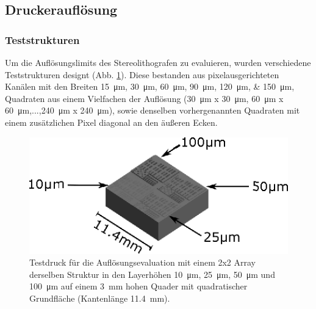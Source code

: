 




\subsection{Druckerauflösung}
\subsubsection{Teststrukturen}
Um die Auflösungslimits des Stereolithografen zu evaluieren, wurden verschiedene Teststrukturen designt (Abb. \ref{fig:ResolutionV1}). Diese bestanden aus pixelausgerichteten Kanälen mit den Breiten \SIlist{15; 30; 60; 90; 120; 150}{\micro \meter}, Quadraten aus einem Vielfachen der Auflösung (\SI{30}{\micro\meter} x \SI{30}{\micro\meter}, \SI{60}{\micro\meter} x \SI{60}{\micro\meter},...,\SI{240}{\micro\meter} x \SI{240}{\micro\meter}), sowie denselben vorhergenannten Quadraten mit einem zusätzlichen Pixel diagonal an den äußeren Ecken.

\begin{figure}[!h]
    \centering
    \includegraphics[width=\linewidth]{img/ResolutionV1.eps}
    \caption{Testdruck für die Auflösungsevaluation mit einem 2x2 Array derselben Struktur in den Layerhöhen \SI{10}{\micro\meter}, \SI{25}{\micro\meter}, \SI{50}{\micro\meter} und \SI{100}{\micro\meter} auf einem \SI{3}{\milli\meter} hohen Quader mit quadratischer Grundfläche (Kantenlänge \SI{11.4}{\milli\meter}).}
    \label{fig:ResolutionV1}
\end{figure}

